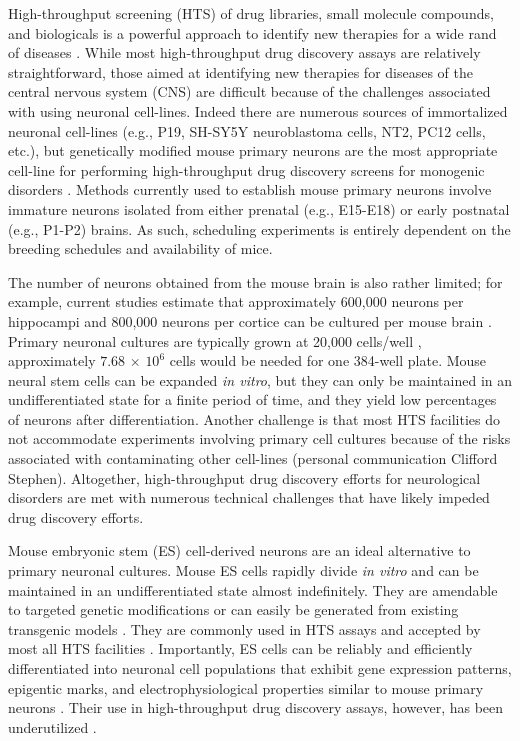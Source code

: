 High-throughput screening (HTS) of drug libraries, small molecule compounds, and biologicals is a powerful approach to identify new therapies for a wide rand of diseases \cite{Aubi2015,Holbeck2004,Macarron2011,Seto2015,Stewart2015a,Stone2015,White1998,Zhang2007}. While most high-throughput drug discovery assays are relatively straightforward, those aimed at identifying new therapies for diseases of the central nervous system (CNS) are difficult because of the challenges associated with using neuronal cell-lines. Indeed there are numerous sources of immortalized neuronal cell-lines (e.g., P19, SH-SY5Y neuroblastoma cells, NT2, PC12 cells, etc.), but genetically modified mouse primary neurons are the most appropriate cell-line for performing high-throughput drug discovery screens for monogenic disorders \cite{Bernstock2016,Berry2015,Eglen2008,Gordon2015,Kaltenbach2010,Mazzio2015,Pouton2007,Schulte2011,Stewart2015b}. Methods currently used to establish mouse primary neurons involve immature neurons isolated from either prenatal (e.g., E15-E18) or early postnatal (e.g., P1-P2) brains. As such, scheduling experiments is entirely dependent on the breeding schedules and availability of mice.

The number of neurons obtained from the mouse brain is also rather limited; for example, current studies estimate that approximately 600,000 neurons per hippocampi and 800,000 neurons per cortice can be cultured per mouse brain \cite{Beaudoin2012}. Primary neuronal cultures are typically grown at 20,000 cells/well \cite{Huang2012}, approximately $7.68$ $\times$ $10^6$ cells would be needed for one 384-well plate. Mouse neural stem cells can be expanded \textit{in vitro}, but they can only be maintained in an undifferentiated state for a finite period of time, and they yield low percentages of neurons after differentiation. Another challenge is that most HTS facilities do not accommodate experiments involving primary cell cultures because of the risks associated with contaminating other cell-lines (personal communication Clifford Stephen). Altogether, high-throughput drug discovery efforts for neurological disorders are met with numerous technical challenges that have likely impeded drug discovery efforts.

Mouse embryonic stem (ES) cell-derived neurons are an ideal alternative to primary neuronal cultures. Mouse ES cells rapidly divide \textit{in vitro} and can be maintained in an undifferentiated state almost indefinitely. They are amendable to targeted genetic modifications or can easily be generated from existing transgenic models \cite{Gonzalez2014,Vasileva2015,Wang2012,Zhu2014}. They are commonly used in HTS assays and accepted by most all HTS facilities \cite{Desbordes2008}. Importantly, ES cells can be reliably and efficiently differentiated into neuronal cell populations that exhibit gene expression patterns, epigentic marks, and electrophysiological properties similar to mouse primary neurons \cite{Benninger2003,Garcia2012,Kim2002,Weick2011,Young2014}. Their use in high-throughput drug discovery assays, however, has been underutilized \cite{Breier2008,Koike-Yusa2014,Sadek2008,Tumarkin2011,Yoshikawa2006}.

